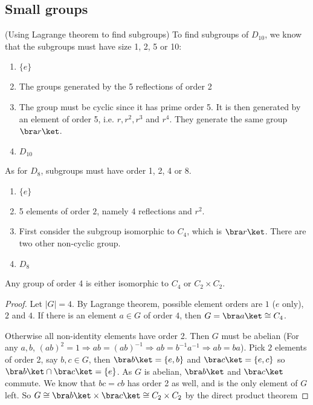\documentclass[a4pape]{article}
\begin{document}
\subsection{Small groups}
\begin{eg}
  (Using Lagrange theorem to find subgroups) To find subgroups of $D_{10}$, we know that the subgroups must have size 1, 2, 5 or 10:
  \begin{enumerate}[label=\arabic{*}:]
  \item $\{e\}$
  \item The groups generated by the 5 reflections of order 2
  \setcounter{enumi}{4}
  \item The group must be cyclic since it has prime order 5. It is then generated by an element of order 5, i.e. $r, r^2, r^3$ and $r^4$. They generate the same group $\bra r\ket$.
    \setcounter{enumi}{9}
  \item $D_{10}$
  \end{enumerate}

  As for $D_8$, subgroups must have order 1, 2, 4 or 8.
  \begin{enumerate}[label=\arabic{*}:]
  \item $\{e\}$
  \item 5 elements of order $2$, namely 4 reflections and $r^2$.
  \setcounter{enumi}{3}
  \item First consider the subgroup isomorphic to $C_4$, which is $\bra r\ket$. There are two other non-cyclic group.
    \setcounter{enumi}{7}
  \item $D_8$
  \end{enumerate}
\end{eg}

\begin{prop}
  Any group of order 4 is either isomorphic to $C_4$ or $C_2\times C_2$.
\end{prop}

\begin{proof}
  Let $|G| = 4$. By Lagrange theorem, possible element orders are $1$ ($e$ only), $2$ and $4$. If there is an element $a\in G$ of order $4$, then $G = \bra a\ket \cong C_4$.

  Otherwise all non-identity elements have order 2. Then $G$ must be abelian (For any $a, b$, $(ab)^2 = 1 \Rightarrow ab = (ab)^{-1} \Rightarrow ab = b^{-1}a^{-1} \Rightarrow ab = ba$).
  Pick $2$ elements  of order 2, say $b, c\in G$, then $\bra b\ket=\{e, b\}$ and $\bra c\ket = \{e, c\}$ so $\bra b\ket\cap \bra c\ket = \{e\}$. As $G$ is abelian, $\bra b\ket$ and $\bra c\ket$ commute. We know that $bc = cb$ has order 2 as well, and is the only element of $G$ left. So $G \cong \bra b\ket\times \bra c\ket \cong C_2\times C_2$ by the direct product theorem
\end{proof}
\end{document}
